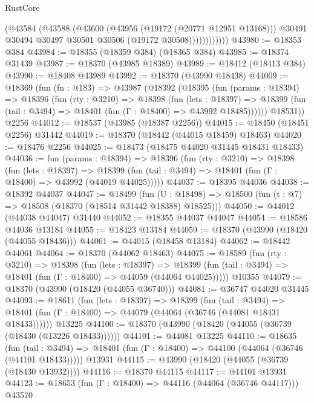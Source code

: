 \begin{lexlean}{RustCore}
\begin{coremodule}
                    (@43584
                      (@43588
                        (@43600
                          (@43956 (@19172 (@20771 @12951 @13168)))
                          @30491
                          @30494
                          @30497
                          @30501
                          @30506
                          (@19172 @30508))))))))))))
@43980 := @18353 @384
@43984 := @18355 (@18359 @384) (@18365 @384)
@43985 := @18374 @31439
@43987 := @18370 (@43985 @18389)
@43989 := @18412 (@18413 @384)
@43990 := @18408 @43989
@43992 := @18370 (@43990 @18438)
@44009 := @18369
    (fun (fn : @183) =>
    @43987
      (@18392
        (@18395
          (fun (params : @18394) =>
          @18396
            (fun (rty : @3210) =>
            @18398
              (fun (lets : @18397) =>
              @18399 (fun (tail : @3494) => @18401 (fun (Γ : @18400) => @43992 @18485))))))
        @18531))
    @2256
@44012 := @18537 (@43985 (@18387 @2256))
@44015 := @18450 (@18451 @2256) @31442
@44019 := @18370 (@18442 (@44015 @18459) @18463)
@44020 := @18476 @2256
@44025 := @18473 (@18475 @44020 @31445 @18431 @18433)
@44036 := fun (params : @18394) =>
  @18396
    (fun (rty : @3210) =>
    @18398
      (fun (lets : @18397) =>
      @18399 (fun (tail : @3494) => @18401 (fun (Γ : @18400) => @43992 (@44019 @44025)))))
@44037 := @18395 @44036
@44038 := @18392 @44037
@44047 := @18499
    (fun (U : @18498) => @18500 (fun (t : @7) => @18508 (@18370 (@18514 @31442 @18388) @18525)))
@44050 := @44012 (@44038 @44047) @31440
@44052 := @18355 @44037 @44047
@44054 := @18586 @44036 @13184
@44055 := @18423 @13184
@44059 := @18370 (@43990 (@18420 (@44055 @18436)))
@44061 := @44015 (@18458 @13184)
@44062 := @18442 @44061
@44064 := @18370 (@44062 @18463)
@44075 := @18589
    (fun (rty : @3210) =>
    @18398
      (fun (lets : @18397) =>
      @18399 (fun (tail : @3494) => @18401 (fun (Γ : @18400) => @44059 (@44064 @44025)))))
    @10355
@44079 := @18370 (@43990 (@18420 (@44055 @36740)))
@44081 := @36747 @44020 @31445
@44093 := @18611
    (fun (lets : @18397) =>
    @18399
      (fun (tail : @3494) =>
      @18401 (fun (Γ : @18400) => @44079 (@44064 (@36746 (@44081 @18431 @18433))))))
    @13225
@44100 := @18370 (@43990 (@18420 (@44055 (@36739 (@18430 (@13226 @18433))))))
@44101 := @44081 @13225
@44110 := @18635
    (fun (tail : @3494) => @18401 (fun (Γ : @18400) => @44100 (@44064 (@36746 (@44101 @18433)))))
    @13931
@44115 := @43990 (@18420 (@44055 (@36739 (@18430 @13932))))
@44116 := @18370 @44115
@44117 := @44101 @13931
@44123 := @18653 (fun (Γ : @18400) => @44116 (@44064 (@36746 @44117))) @43570

\end{coremodule}
\end{lexlean}
